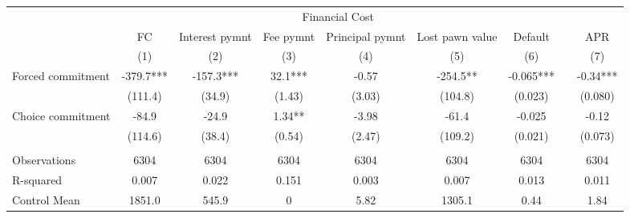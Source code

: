 \begin{tabular}{lcccccccc}
\toprule
      & \multicolumn{6}{c}{Financial Cost}            &       &  \\
\cmidrule{2-7}      & FC    & Interest pymnt & Fee pymnt & Principal pymnt & Lost pawn value & Default &       & APR \\
\midrule
      & (1)   & (2)   & (3)   & (4)   & (5)   & (6)   &       & (7) \\
\midrule
\midrule
Forced commitment & -379.7*** & -157.3*** & 32.1*** & -0.57 & -254.5** & -0.065*** &       & -0.34*** \\
      & (111.4) & (34.9) & (1.43) & (3.03) & (104.8) & (0.023) &       & (0.080) \\
Choice commitment & -84.9 & -24.9 & 1.34** & -3.98 & -61.4 & -0.025 &       & -0.12 \\
      & (114.6) & (38.4) & (0.54) & (2.47) & (109.2) & (0.021) &       & (0.073) \\
      &       &       &       &       &       &       &       &  \\
\midrule
Observations & 6304  & 6304  & 6304  & 6304  & 6304  & 6304  &       & 6304 \\
R-squared & 0.007 & 0.022 & 0.151 & 0.003 & 0.007 & 0.013 &       & 0.011 \\
Control Mean & 1851.0 & 545.9 & 0     & 5.82  & 1305.1 & 0.44  &       & 1.84 \\
\bottomrule
\bottomrule
\end{tabular}%
